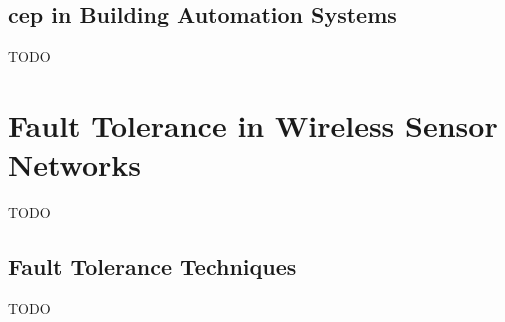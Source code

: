 \subsection{\acf{cep} in Building Automation Systems}
TODO

\section{Fault Tolerance in Wireless Sensor Networks}
TODO

\subsection{Fault Tolerance Techniques}
TODO



